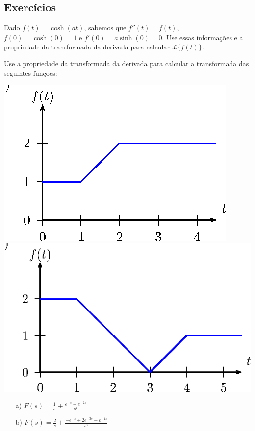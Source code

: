 \subsection*{Exercícios}
\begin{exer}
Dado $f(t)=\cosh(at)$, sabemos que $f''(t)=f(t)$, $f(0)=\cosh(0)=1$ e $f'(0)=a\sinh(0)=0$. Use essas informações e a propriedade da transformada da derivada para calcular $\mathcal{L}\{f(t)\}$.
\end{exer}
\begin{exer} Use a propriedade da transformada da derivada para calcular a transformada das seguintes funções:
\begin{center}

\includegraphics{cap_linear_deriva/pics/figura_1}
\includegraphics{cap_linear_deriva/pics/figura_2}\end{center}
\end{exer}
\begin{resp}
 \begin{itemize}
  \item[a)] $F(s)=\frac{1}{s}+\frac{e^{-s}-e^{-2s}}{s^2}$
      \item[b)] $F(s)=\frac{2}{s}+\frac{-e^{-s}+2e^{-3s}-e^{-4s}}{s^2}$
 \end{itemize}
\end{resp}
